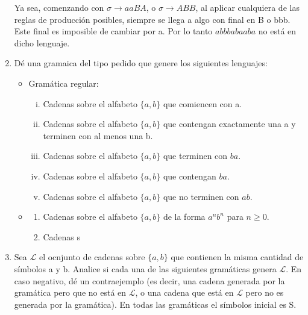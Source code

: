 \documentclass{article}
\begin{document}
\begin{enumerate}[1.]
    Ya sea, comenzando con $\sigma \rightarrow aaBA$, o $\sigma \rightarrow ABB$, al aplicar cualquiera de las reglas
    de producción posibles, siempre se llega a algo con final en B o bbb. Este final es imposible de cambiar por a.
    Por lo tanto $abbbabaaba$ no está en dicho lenguaje.
  \item
    Dé una gramaica del tipo pedido que genere los siguientes lenguajes:
    \begin{itemize}
      \item
        Gramática regular:
        \begin{enumerate}[i.]
          \item
            Cadenas sobre el alfabeto $\{ a,b \}$ que comiencen con a.
          \item
            Cadenas sobre el alfabeto $\{ a,b \}$ que contengan exactamente una a y terminen con al menos
            una b.
          \item
            Cadenas sobre el alfabeto $\{ a,b\}$ que terminen con $ba$.
          \item
            Cadenas sobre el alfabeto $\{a,b\}$ que contengan $ba$.
          \item
            Cadenas sobre el alfabeto $\{a,b\}$ que no terminen con $ab$.
        \end{enumerate}
      \item
        \begin{enumerate}
          \item
            Cadenas sobre el alfabeto $\{a,b\}$ de la forma $a^n b^n$ para $n \geq 0$.
          \item
            Cadenas s
        \end{enumerate}
    \end{itemize}
  \item
    Sea $\mathcal{L}$ el ocnjunto de cadenas sobre $\{a,b\}$ que contienen la misma cantidad de símbolos
    a y b. Analice si cada una de las siguientes gramáticas genera $\mathcal{L}$. En caso negativo, dé un
    contraejemplo (es decir, una cadena generada por la gramática pero que no está en $\mathcal{L}$, o
    una cadena que está en $\mathcal{L}$ pero no es generada por la gramática). En todas las gramáticas el
    símbolos inicial es S.


\end{enumerate}
\end{document}
